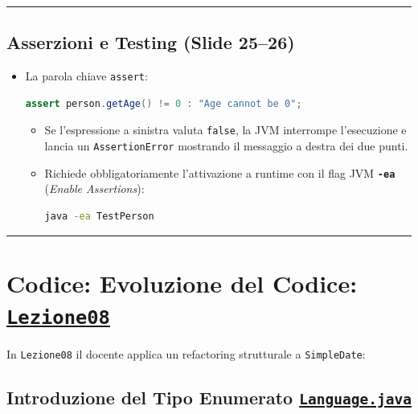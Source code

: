 \documentclass[11pt,a4paper,oneside]{report}
\newcommand{\passthrough}[1]{#1}
\begin{document}
\begin{center}\rule{0.5\linewidth}{0.5pt}\end{center}

\subsection{Asserzioni e Testing (Slide
25--26)}\label{chap07_asserzioni-e-testing-slide-2526}

\begin{itemize}
\item
  La parola chiave \passthrough{\lstinline!assert!}:

\begin{lstlisting}[language=Java]
assert person.getAge() != 0 : "Age cannot be 0";
\end{lstlisting}

  \begin{itemize}
  \item
    Se l'espressione a sinistra valuta \passthrough{\lstinline!false!},
    la JVM interrompe l'esecuzione e lancia un
    \passthrough{\lstinline!AssertionError!} mostrando il messaggio a
    destra dei due punti.
  \item
    Richiede obbligatoriamente l'attivazione a runtime con il flag JVM
    \textbf{\passthrough{\lstinline!-ea!}} (\emph{Enable Assertions}):

\begin{lstlisting}[language=bash]
java -ea TestPerson
\end{lstlisting}
  \end{itemize}
\end{itemize}

\begin{center}\rule{0.5\linewidth}{0.5pt}\end{center}

\section{\texorpdfstring{Codice: Evoluzione del Codice:
\href{file:///home/wally/Documenti/GitHub/Programmazione-II/25-26/Teoria-e-Esercitazioni/Codice-20260902/Lezione08/SimpleDate/src}{\texttt{Lezione08}}}{Codice: Evoluzione del Codice: Lezione08}}\label{chap07_codice-evoluzione-del-codice-lezione08}

In \passthrough{\lstinline!Lezione08!} il docente applica un refactoring
strutturale a \passthrough{\lstinline!SimpleDate!}:

\subsection{\texorpdfstring{Introduzione del Tipo Enumerato
\href{file:///home/wally/Documenti/GitHub/Programmazione-II/25-26/Teoria-e-Esercitazioni/Codice-20260902/Lezione08/SimpleDate/src/Language.java}{\texttt{Language.java}}}{Introduzione del Tipo Enumerato Language.java}}\label{chap07_introduzione-del-tipo-enumerato-language.java}
\end{document}

